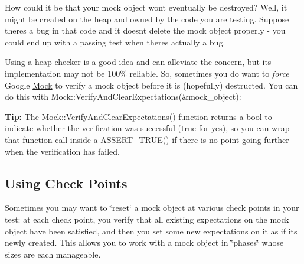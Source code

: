 How could it be that your mock object won\textquotesingle{}t eventually be destroyed? Well, it might be created on the heap and owned by the code you are testing. Suppose there\textquotesingle{}s a bug in that code and it doesn\textquotesingle{}t delete the mock object properly -\/ you could end up with a passing test when there\textquotesingle{}s actually a bug.

Using a heap checker is a good idea and can alleviate the concern, but its implementation may not be 100\% reliable. So, sometimes you do want to {\itshape force} Google \mbox{\hyperlink{class_mock}{Mock}} to verify a mock object before it is (hopefully) destructed. You can do this with {\ttfamily Mock\+::\+Verify\+And\+Clear\+Expectations(\&mock\+\_\+object)}\+:


\begin{DoxyCode}{0}
\DoxyCodeLine{}
\DoxyCodeLine{}
\DoxyCodeLine{}
\end{DoxyCode}


{\bfseries{Tip\+:}} The {\ttfamily Mock\+::\+Verify\+And\+Clear\+Expectations()} function returns a {\ttfamily bool} to indicate whether the verification was successful ({\ttfamily true} for yes), so you can wrap that function call inside a {\ttfamily A\+S\+S\+E\+R\+T\+\_\+\+T\+R\+U\+E()} if there is no point going further when the verification has failed.

\subsection*{Using Check Points}

Sometimes you may want to \char`\"{}reset\char`\"{} a mock object at various check points in your test\+: at each check point, you verify that all existing expectations on the mock object have been satisfied, and then you set some new expectations on it as if it\textquotesingle{}s newly created. This allows you to work with a mock object in \char`\"{}phases\char`\"{} whose sizes are each manageable.

